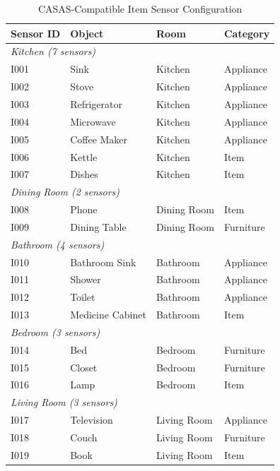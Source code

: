 
\begin{table}[t]
\centering
\caption{CASAS-Compatible Item Sensor Configuration}
\label{tab:item_sensors}
\begin{tabular}{@{}llll@{}}
\toprule
\textbf{Sensor ID} & \textbf{Object} & \textbf{Room} & \textbf{Category} \\
\midrule
\multicolumn{4}{l}{\textit{Kitchen (7 sensors)}} \\
I001 & Sink & Kitchen & Appliance \\
I002 & Stove & Kitchen & Appliance \\
I003 & Refrigerator & Kitchen & Appliance \\
I004 & Microwave & Kitchen & Appliance \\
I005 & Coffee Maker & Kitchen & Appliance \\
I006 & Kettle & Kitchen & Item \\
I007 & Dishes & Kitchen & Item \\
\midrule
\multicolumn{4}{l}{\textit{Dining Room (2 sensors)}} \\
I008 & Phone & Dining Room & Item \\
I009 & Dining Table & Dining Room & Furniture \\
\midrule
\multicolumn{4}{l}{\textit{Bathroom (4 sensors)}} \\
I010 & Bathroom Sink & Bathroom & Appliance \\
I011 & Shower & Bathroom & Appliance \\
I012 & Toilet & Bathroom & Appliance \\
I013 & Medicine Cabinet & Bathroom & Item \\
\midrule
\multicolumn{4}{l}{\textit{Bedroom (3 sensors)}} \\
I014 & Bed & Bedroom & Furniture \\
I015 & Closet & Bedroom & Furniture \\
I016 & Lamp & Bedroom & Item \\
\midrule
\multicolumn{4}{l}{\textit{Living Room (3 sensors)}} \\
I017 & Television & Living Room & Appliance \\
I018 & Couch & Living Room & Furniture \\
I019 & Book & Living Room & Item \\
\bottomrule
\end{tabular}
\end{table}


